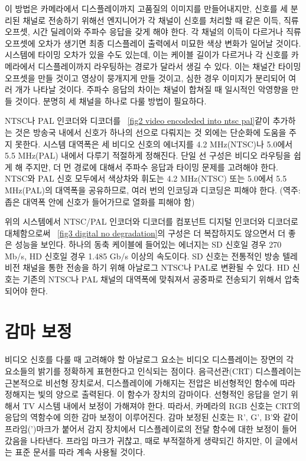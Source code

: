이 방법은 카메라에서 디스플레이까지 고품질의 이미지를 만들어내지만, 신호를 세 분리된 채널로 전송하기 위해선 엔지니어가 각 채널이 신호를 처리할 때 같은 이득, 직류 오프셋, 시간 딜레이와 주파수 응답을 갖게 해야 한다.
각 채널의 이득이 다르거나 직류 오프셋에 오차가 생기면 최종 디스플레이 출력에서 미묘한 색상 변화가 일어날 것이다.
시스템에 타이밍 오차가 있을 수도 있는데, 이는 케이블 길이가 다르거나 각 신호를 카메라에서 디스플레이까지 라우팅하는 경로가 달라서 생길 수 있다.
이는 채널간 타이밍 오프셋을 만들 것이고 영상이 뭉개지게 만들 것이고, 심한 경우 이미지가 분리되어 여러 개가 나타날 것이다.
주파수 응답의 차이는 채널이 합쳐질 때 일시적인 악영향을 만들 것이다.
분명히 세 채널을 하나로 다룰 방법이 필요하다.


NTSC나 PAL 인코더와 디코더를 \figurename~\ref{fig2 video encodeded into ntsc pal}\와 같이 추가하는 것은 방송국 내에서 신호가 하나의 선으로 다뤄지는 것 외에는 단순화에 도움을 주지 못한다.
시스템 대역폭은 세 비디오 신호의 에너지를 4.2 MHz(NTSC)나 5.0에서 5.5 MHz(PAL) 내에서 다루기 적절하게 정해진다.
단일 선 구성은 비디오 라우팅을 쉽게 해 주지만, 더 먼 경로에 대해서 주파수 응답과 타이밍 문제를 고려해야 한다.
NTSC와 PAL 신호 모두에서 색상차와 휘도는 4.2 MHz(NTSC) 또는 5.0에서 5.5 MHz(PAL)의 대역폭을 공유하므로, 여러 번의 인코딩과 디코딩은 피해야 한다.
(역주: 좁은 대역폭 안에 신호가 들어가므로 열화를 피해야 함)


위의 시스템에서 NTSC/PAL 인코더와 디코더를 컴포넌트 디지털 인코더와 디코더로 대체함으로써 \figurename~\ref{fig3 digital no degradation}의 구성은 더 복잡하지도 않으면서 더 좋은 성능을 보인다.
하나의 동축 케이블에 들어있는 에너지는 SD 신호일 경우 270 Mb/s, HD 신호일 경우 1.485 Gb/s 이상의 속도이다.
SD 신호는 전통적인 방송 텔레비전 채널을 통한 전송을 하기 위해 아날로그 NTSC나 PAL로 변환될 수 있다.
HD 신호는 기존의 NTSC나 PAL 채널의 대역폭에 맞춰져서 공중파로 전송되기 위해서 압축되어야 한다.

\section{감마 보정}
비디오 신호를 다룰 때 고려해야 할 아날로그 요소는 비디오 디스플레이는 장면의 각 요소들의 밝기를 정확하게 표현한다고 인식되는 점이다.
음극선관(CRT) 디스플레이는 근본적으로 비선형 장치로서, 디스플레이에 가해지는 전압은 비선형적인 함수에 따라 정해지는 빛의 양으로 출력된다.
이 함수가 장치의 감마이다. 선형적인 응답을 얻기 위해서 TV 시스템 내에서 보정이 가해져야 한다.
따라서, 카메라의 RGB 신호는 CRT의 응답의 역함수에 의한 감마 보정이 이루어진다. 감마 보정된 신호는 R', G', B'와 같이 프라임(')마크가 붙어서 감지 장치에서 디스플레이로의 전달 함수에 대한 보정이 들어갔음을 나타낸다.
프라임 마크가 귀찮고, 때로 부적절하게 생략되긴 하지만, 이 글에서는 표준 문서를 따라 계속 사용될 것이다.



